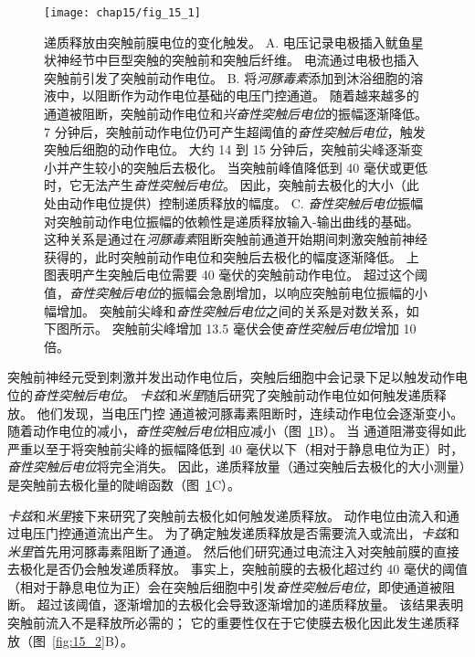 \begin{figure}[htbp]
	\centering
	\texttt{[image: chap15/fig\_15\_1]}
	\caption{递质释放由突触前膜电位的变化触发\cite{katz1967study}。
	A. 电压记录电极插入鱿鱼星状神经节中巨型突触的突触前和突触后纤维。
	电流通过电极也插入突触前引发了突触前动作电位。
	B. 将\textit{河豚毒素}添加到沐浴细胞的溶液中，以阻断作为动作电位基础的电压门控通道。
	随着越来越多的通道被阻断，突触前动作电位和\textit{兴奋性突触后电位}的振幅逐渐降低。
	7 分钟后，突触前动作电位仍可产生超阈值的\textit{奋性突触后电位}，触发突触后细胞的动作电位。
	大约 14 到 15 分钟后，突触前尖峰逐渐变小并产生较小的突触后去极化。
	当突触前峰值降低到 40 毫伏或更低时，它无法产生\textit{奋性突触后电位}。
	因此，突触前去极化的大小（此处由动作电位提供）控制递质释放的幅度。
	C. \textit{奋性突触后电位}振幅对突触前动作电位振幅的依赖性是递质释放输入-输出曲线的基础。
	这种关系是通过在\textit{河豚毒素}阻断突触前通道开始期间刺激突触前神经获得的，此时突触前动作电位和突触后去极化的幅度逐渐降低。
	上图表明产生突触后电位需要 40 毫伏的突触前动作电位。
	超过这个阈值，\textit{奋性突触后电位}的振幅会急剧增加，以响应突触前电位振幅的小幅增加。
	突触前尖峰和\textit{奋性突触后电位}之间的关系是对数关系，如下图所示。
	突触前尖峰增加 13.5 毫伏会使\textit{奋性突触后电位}增加 10 倍。}
	\label{fig:15_1}
\end{figure}
突触前神经元受到刺激并发出动作电位后，突触后细胞中会记录下足以触发动作电位的\textit{奋性突触后电位}。
\textit{卡兹}和\textit{米里}随后研究了突触前动作电位如何触发递质释放。
他们发现，当电压门控  通道被河豚毒素阻断时，连续动作电位会逐渐变小。
随着动作电位的减小，\textit{奋性突触后电位}相应减小（图~\ref{fig:15_1}B）。
当  通道阻滞变得如此严重以至于将突触前尖峰的振幅降低到 40 毫伏以下（相对于静息电位为正）时，\textit{奋性突触后电位}将完全消失。
因此，递质释放量（通过突触后去极化的大小测量）是突触前去极化量的陡峭函数（图~\ref{fig:15_1}C）。


\textit{卡兹}和\textit{米里}接下来研究了突触前去极化如何触发递质释放。
动作电位由流入和通过电压门控通道流出产生。
为了确定触发递质释放是否需要流入或流出，\textit{卡兹}和\textit{米里}首先用河豚毒素阻断了通道。
然后他们研究通过电流注入对突触前膜的直接去极化是否仍会触发递质释放。
事实上，突触前膜的去极化超过约 40 毫伏的阈值（相对于静息电位为正）会在突触后细胞中引发\textit{奋性突触后电位}，即使通道被阻断。
超过该阈值，逐渐增加的去极化会导致逐渐增加的递质释放量。
该结果表明突触前流入不是释放所必需的；
它的重要性仅在于它使膜去极化因此发生递质释放（图~\ref{fig:15_2}B）。


